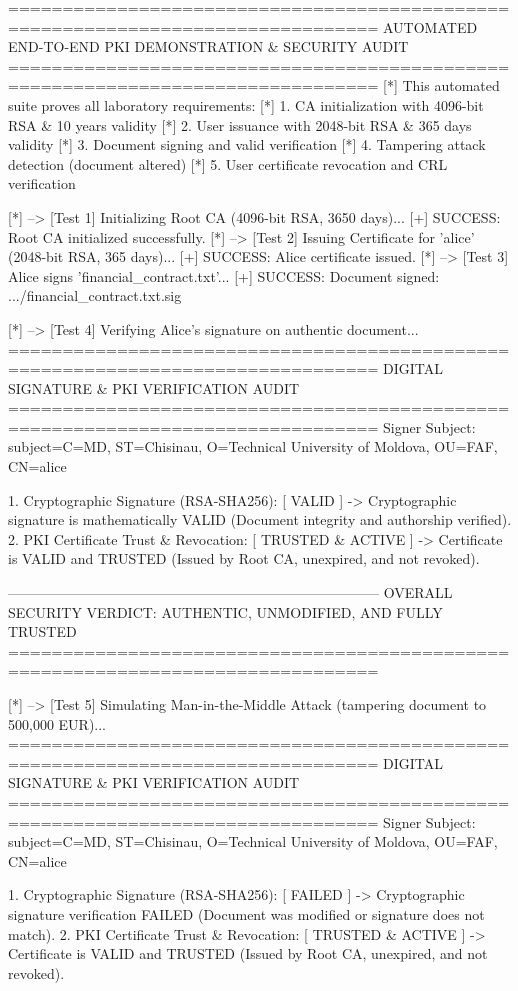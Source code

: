 \documentclass[12pt,a4paper]{article}
\begin{document}
\begin{terminalwindow}
================================================================================
  AUTOMATED END-TO-END PKI DEMONSTRATION & SECURITY AUDIT
================================================================================
[*] This automated suite proves all laboratory requirements:
[*]   1. CA initialization with 4096-bit RSA & 10 years validity
[*]   2. User issuance with 2048-bit RSA & 365 days validity
[*]   3. Document signing and valid verification
[*]   4. Tampering attack detection (document altered)
[*]   5. User certificate revocation and CRL verification

[*] --> [Test 1] Initializing Root CA (4096-bit RSA, 3650 days)...
[+] SUCCESS: Root CA initialized successfully.
[*] --> [Test 2] Issuing Certificate for 'alice' (2048-bit RSA, 365 days)...
[+] SUCCESS: Alice certificate issued.
[*] --> [Test 3] Alice signs 'financial_contract.txt'...
[+] SUCCESS: Document signed: .../financial_contract.txt.sig

[*] --> [Test 4] Verifying Alice's signature on authentic document...
================================================================================
  DIGITAL SIGNATURE & PKI VERIFICATION AUDIT
================================================================================
Signer Subject:  subject=C=MD, ST=Chisinau, O=Technical University of Moldova, OU=FAF, CN=alice

1. Cryptographic Signature (RSA-SHA256): [ VALID ]
   -> Cryptographic signature is mathematically VALID (Document integrity and authorship verified).
2. PKI Certificate Trust & Revocation: [ TRUSTED & ACTIVE ]
   -> Certificate is VALID and TRUSTED (Issued by Root CA, unexpired, and not revoked).

--------------------------------------------------------------------------------
OVERALL SECURITY VERDICT: AUTHENTIC, UNMODIFIED, AND FULLY TRUSTED
================================================================================

[*] --> [Test 5] Simulating Man-in-the-Middle Attack (tampering document to 500,000 EUR)...
================================================================================
  DIGITAL SIGNATURE & PKI VERIFICATION AUDIT
================================================================================
Signer Subject:  subject=C=MD, ST=Chisinau, O=Technical University of Moldova, OU=FAF, CN=alice

1. Cryptographic Signature (RSA-SHA256): [ FAILED ]
   -> Cryptographic signature verification FAILED (Document was modified or signature does not match).
2. PKI Certificate Trust & Revocation: [ TRUSTED & ACTIVE ]
   -> Certificate is VALID and TRUSTED (Issued by Root CA, unexpired, and not revoked).


\end{terminalwindow}
\end{document}

